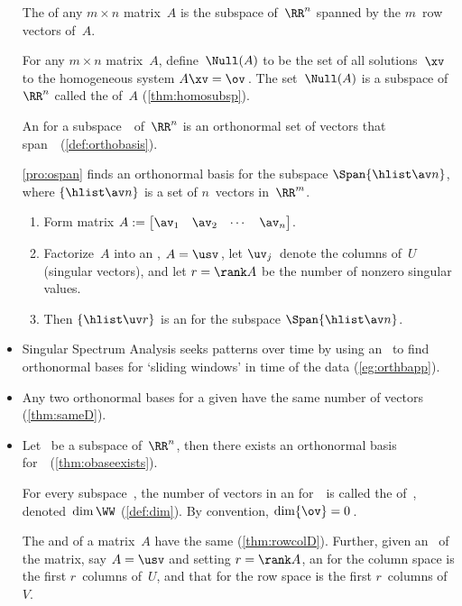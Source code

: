 \begin{itemize}
The  of any $m\times n$ matrix~$A$ is the {subspace} of~$\RR^n$ {span}ned by the \(m\)~{row vector}s of~$A$.

\itemme For any $m\times n$ matrix~$A$, define~$\Null(A)$ to be the set of all solutions~$\xv$ to the {homogeneous} system $A\xv=\ov$\,. 
The set~\(\Null(A)\) is a {subspace} of~$\RR^n$ called the  of~$A$ (\cref{thm:homosubsp}).

\itemme An  for a {subspace}~\WW\ of~\(\RR^n\) is an {orthonormal set} of vectors that span~\WW\ (\cref{def:orthobasis}).

\itemhi  \cref{pro:ospan} finds an {orthonormal basis} for the subspace \(\Span\{\hlist\av n\}\), where $\{\hlist\av n\}$ is a set of $n$~vectors in~\(\RR^m\). 
\begin{enumerate}
\item Form matrix $A:= \begin{bmatrix} \av_1 & \av_2& \cdots&\av_n \end{bmatrix}$. 
\item Factorize~\(A\) into an \svd, $A=\usv$\,, let \(\uv_j\)~denote the columns of~$U$ ({singular vector}s), and let \(r=\rank A\) be the number of nonzero {singular value}s.  
\item Then \(\{\hlist\uv r\}\) is an  for the subspace \(\Span\{\hlist\av n\}\).
\end{enumerate}

\item Singular Spectrum Analysis seeks patterns over time by using an \svd\ to find orthonormal bases for `sliding windows' in time of the data (\cref{eg:orthbapp}).

\item Any two orthonormal bases for a given  have the same number of vectors (\cref{thm:sameD}).

\item Let \WW\ be a subspace of~\(\RR^n\), then there exists an orthonormal basis for~\WW\ (\cref{thm:obaseexists}).

\itemhi For every subspace~\WW, the number of vectors in an  for~\WW\ is called the  of~\WW, denoted~\(\dim\WW\) (\cref{def:dim}).
By convention, \(\dim\{\ov\}=0\)\,.

\itemme The  and  of a matrix~\(A\) have the same  (\cref{thm:rowcolD}).
Further, given an \svd\ of the matrix, say \(A=\usv\) and setting \(r=\rank A\), an  for the column space is the first \(r\)~columns of~\(U\), and that for the row space is the first \(r\)~columns of~\(V\).


\end{itemize}
